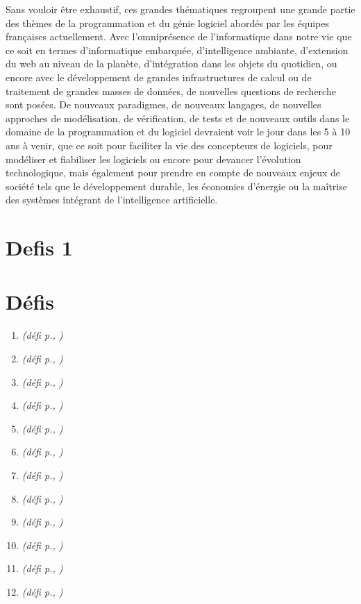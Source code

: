\documentclass[11pt]{article}
\newcommand{\defi}[1]{\emph{(défi p.\pageref{#1}, \cite{#1})}}
\begin{document}
Sans vouloir être exhaustif, ces grandes thématiques regroupent une grande partie des
thèmes de la programmation et du génie logiciel abordés par les équipes
françaises actuellement. 
\noindent
Avec l'omniprésence de l'informatique dans notre vie que ce soit en termes
d'informatique embarquée, d'intelligence ambiante, d'extension du web au niveau
de la planète, d'intégration dans les objets du quotidien, ou encore avec le
développement de grandes infrastructures de calcul ou de traitement de grandes
masses de données, de nouvelles questions de recherche sont posées.
De nouveaux paradigmes, de nouveaux langages, de nouvelles approches de
modélisation, de vérification, de tests et de nouveaux outils dans le domaine
de la programmation et du logiciel devraient voir le jour dans les 5 à 10 ans à
venir, que ce soit pour faciliter la vie des concepteurs de logiciels, pour
modéliser et fiabiliser les logiciels ou encore pour devancer l'évolution
technologique, mais également pour prendre en compte de nouveaux enjeux de
société tels que le développement durable, les économies d'énergie ou la maîtrise des systèmes intégrant de l'intelligence artificielle.



\section{Defis 1}





\section*{Défis}
\begin{enumerate}
\item \defi{combinatoire}
\item \defi{vert}
\item \defi{GLE}
\item \defi{debuggers}
\item \defi{securite}
\item \defi{coevolution}
\item \defi{compilation}
\item \defi{reconfiguration}
\item \defi{argumentation}
\item \defi{IA}
\item \defi{Monniaux}
\item \defi{formelle}
\end{enumerate}
\end{document}
